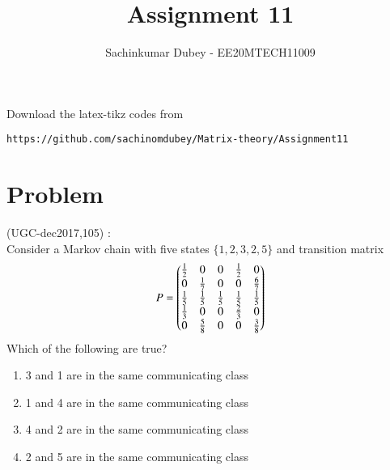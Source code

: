 \documentclass[journal,12pt]{IEEEtran}
\begin{document}
\renewcommand{\thefigure}{\theproblem}

\def\putbox#1#2#3{\makebox[0in][l]{\makebox[#1][l]{}\raisebox{\baselineskip}[0in][0in]{\raisebox{#2}[0in][0in]{#3}}}}
     \def\rightbox#1{\makebox[0in][r]{#1}}
     \def\centbox#1{\makebox[0in]{#1}}
     \def\topbox#1{\raisebox{-\baselineskip}[0in][0in]{#1}}
     \def\midbox#1{\raisebox{-0.5\baselineskip}[0in][0in]{#1}}
\vspace{3cm}
\title{Assignment 11}
\author{Sachinkumar Dubey - EE20MTECH11009}
\maketitle
\bigskip
\renewcommand{\thefigure}{\theenumi}
\renewcommand{\thetable}{\theenumi}
%
Download the latex-tikz codes from 
%
\begin{lstlisting}
https://github.com/sachinomdubey/Matrix-theory/Assignment11
\end{lstlisting}
\section{\textbf{Problem}}
(UGC-dec2017,105) : \\
%
Consider a Markov chain with five states $\{1,2,3,2,5\}$ and transition matrix
\begin{align}
    P=\begin{pmatrix}\frac{1}{2} & 0 & 0 & \frac{1}{2} & 0\\
            0 & \frac{1}{7} & 0 & 0&\frac{6}{7}\\
              \frac{1}{5} & \frac{1}{5} & \frac{1}{5} & \frac{1}{5} & \frac{1}{5}\\ \frac{1}{3} & 0 & 0 & \frac{2}{3} & 0 \\
              0 & \frac{5}{8} & 0 & 0 & \frac{3}{8}\end{pmatrix}
\end{align}
Which of the following are true?\\
\begin{enumerate}
\item 3 and 1 are in the same communicating class
\item 1 and 4 are in the same communicating class
\item 4 and 2 are in the same communicating class
\item 2 and 5 are in the same communicating class
\end{enumerate}
\end{document}

